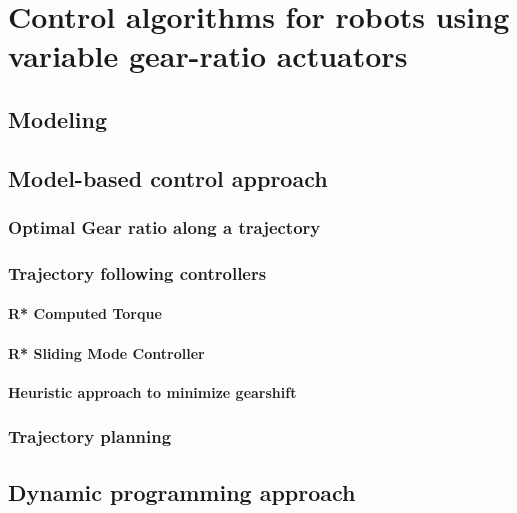 \chapter{Control algorithms for robots using variable gear-ratio actuators}
\label{sec:ControlAndPlanningOfRobotUsingVariableGearRatioActuators}


\section{Modeling}
\label{sec:model}


\section{Model-based control approach}
\label{sec:HierachicalControlApproach}


\subsection{Optimal Gear ratio along a trajectory}

\subsection{Trajectory following controllers}

\subsubsection{R* Computed Torque}
\label{sec:RobustTrajectoryFollowingController}

\subsubsection{R* Sliding Mode Controller}

\subsubsection{Heuristic approach to minimize gearshift}


\subsection{Trajectory planning}
\label{sec:SamplingBasedTrajectoryPlanner}


\section{Dynamic programming approach}
\label{sec:DynamicProgrammingAproach}



